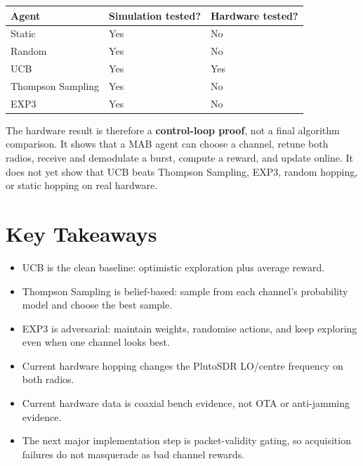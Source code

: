 \documentclass[11pt,a4paper]{article}
\begin{document}
\begin{center}
\begin{tabular}{lll}
\toprule
\textbf{Agent} & \textbf{Simulation tested?} & \textbf{Hardware tested?} \\
\midrule
Static & Yes & No \\
Random & Yes & No \\
UCB & Yes & Yes \\
Thompson Sampling & Yes & No \\
EXP3 & Yes & No \\
\bottomrule
\end{tabular}
\end{center}

The hardware result is therefore a \textbf{control-loop proof}, not a final algorithm comparison. It shows that a MAB agent can choose a channel, retune both radios, receive and demodulate a burst, compute a reward, and update online. It does not yet show that UCB beats Thompson Sampling, EXP3, random hopping, or static hopping on real hardware.

\section{Key Takeaways}

\begin{itemize}
    \item UCB is the clean baseline: optimistic exploration plus average reward.
    \item Thompson Sampling is belief-based: sample from each channel's probability model and choose the best sample.
    \item EXP3 is adversarial: maintain weights, randomise actions, and keep exploring even when one channel looks best.
    \item Current hardware hopping changes the PlutoSDR LO/centre frequency on both radios.
    \item Current hardware data is coaxial bench evidence, not OTA or anti-jamming evidence.
    \item The next major implementation step is packet-validity gating, so acquisition failures do not masquerade as bad channel rewards.
\end{itemize}
\end{document}
